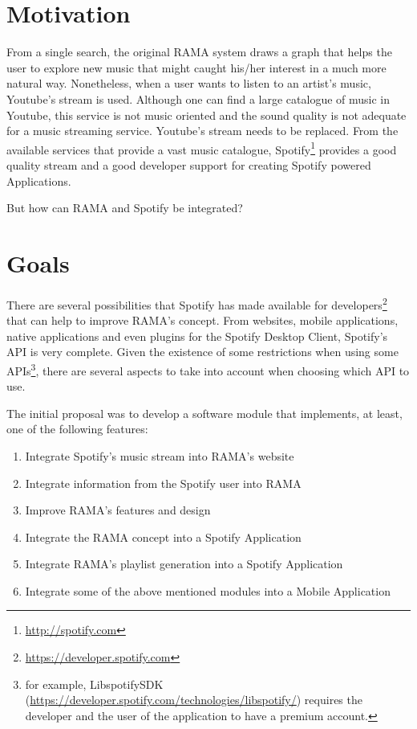 \section{Motivation} \label{sec:motivation}

  From a single search, the original RAMA system draws a graph that helps the user to explore new music that might caught his/her interest in a much more natural way.
  Nonetheless, when a user wants to listen to an artist's music, Youtube's stream is used.
  Although one can find a large catalogue of music in Youtube, this service is not music oriented and the sound quality is not adequate for a music streaming service.
  Youtube's stream needs to be replaced.
  From the available services that provide a vast music catalogue, Spotify\footnote{\url{http://spotify.com}} provides a good quality stream and a good developer support for creating Spotify powered Applications.

  But how can RAMA and Spotify be integrated? \\

\section{Goals}
\label{sec:goals}

  There are several possibilities that Spotify has made available for developers\footnote{\url{https://developer.spotify.com}} that can help to improve RAMA's concept.
  From websites, mobile applications, native applications and even plugins for the Spotify Desktop Client, Spotify's API is very complete.
  Given the existence of some restrictions when using some APIs\footnote{for example, LibspotifySDK (\url{https://developer.spotify.com/technologies/libspotify/}) requires the developer and the user of the application to have a premium account.}, there are several aspects to take into account when choosing which API to use.

  The initial proposal was to develop a software module that implements, at least, one of the following features:

  \begin{enumerate}
    \item \label{intro:obj1} Integrate Spotify's music stream into RAMA's website
    \item \label{intro:obj2} Integrate information from the Spotify user into RAMA
    \item \label{intro:obj3} Improve RAMA's features and design
    \item \label{intro:obj4} Integrate the RAMA concept into a Spotify Application
    \item \label{intro:obj5} Integrate RAMA's playlist generation into a Spotify Application
    \item \label{intro:obj6} Integrate some of the above mentioned modules into a Mobile Application
  \end{enumerate}

